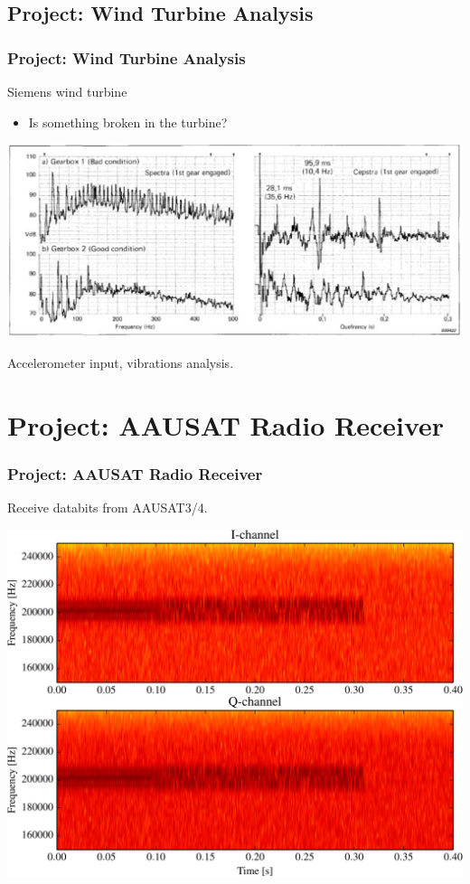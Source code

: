 \subsection{Project: Wind Turbine Analysis}
\begin{frame}
    \frametitle{Project: Wind Turbine Analysis}
    Siemens wind turbine
    \begin{itemize}
    \item Is something broken in the turbine?
    \end{itemize}
    \begin{center}
        \includegraphics[width=\linewidth]{img/wind_1}
    \end{center}
    Accelerometer input, vibrations analysis.
\end{frame}

\section{Project: AAUSAT Radio Receiver}
\begin{frame}
    \frametitle{Project: AAUSAT Radio Receiver}
    Receive databits from AAUSAT3/4.    
    \begin{center}
        \includegraphics[scale=0.5]{img/specgram_nofilter_zoom_medium}
    \end{center}
\end{frame}

